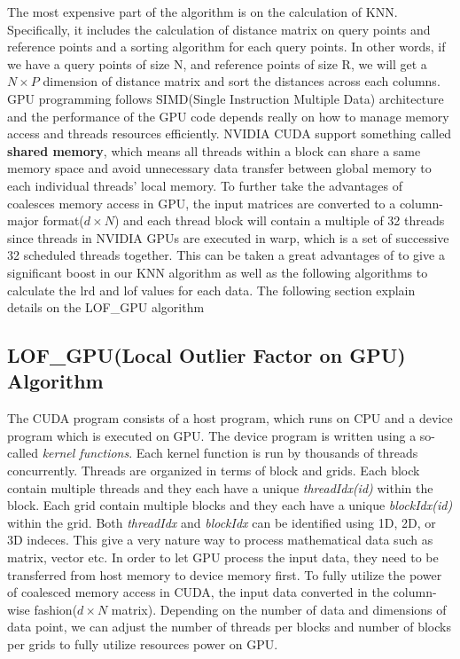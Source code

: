 \documentclass[11pt]{article}       %
\begin{document}
The most expensive part of the algorithm is on the calculation of KNN. Specifically, it includes the calculation of distance matrix on query points and reference points and a sorting algorithm for each query points. In other words, if we have a query points of size N, and reference points of size R, we will get a $N \times P$ dimension of distance matrix and sort the distances across each columns. GPU programming follows SIMD(Single Instruction Multiple Data) architecture and the performance of the GPU code depends really on how to manage memory access and threads resources efficiently. NVIDIA CUDA support something called \textbf{shared memory}, which means all threads within a block can share a same memory space and avoid unnecessary data transfer between global memory to each individual threads' local memory. To further take the advantages of coalesces memory access in GPU, the input matrices are converted to a column-major format($d \times N$) and each thread block will contain a multiple of 32 threads since threads in NVIDIA GPUs are executed in warp, which is a set of successive 32 scheduled threads together. This can be taken a great advantages of to give a significant boost in our KNN algorithm as well as the following algorithms to calculate the lrd and lof values for each data. The following section explain details on the LOF\_GPU algorithm

\subsection{LOF\_GPU(Local Outlier Factor on GPU) Algorithm}

The CUDA program consists of a host program, which runs on CPU and a device program which is executed on GPU. The device program is written using a so-called \textit{kernel functions}. Each kernel function is run by thousands of threads concurrently. Threads are organized in terms of block and grids. Each block contain multiple threads and they each have a unique \textit{threadIdx(id)} within the block. Each grid contain multiple blocks and they each have a unique \textit{blockIdx(id)} within the grid. Both \textit{threadIdx} and \textit{blockIdx} can be identified using 1D, 2D, or 3D indeces. This give a very nature way to process mathematical data such as matrix, vector etc. In order to let GPU process the input data, they need to be transferred from host memory to device memory first. To fully utilize the power of coalesced memory access in CUDA, the input data converted in the column-wise fashion($d \times N$ matrix). Depending on the number of data and dimensions of data point, we can adjust the number of threads per blocks and number of blocks per grids to fully utilize resources power on GPU. 
\end{document}
